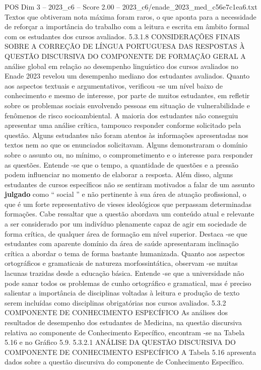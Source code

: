 \begin{textsample}{POS Dim 3 – 2023\_c6 – Score 2.00 – 2023\_c6/enade\_2023\_med\_c56e7c1ea6.txt}
Textos que obtiveram nota máxima foram raros, o que aponta para a necessidade de reforçar a importância do trabalho com a leitura e escrita em âmbito formal com os estudantes dos cursos avaliados. 5.3.1.8 CONSIDERAÇÕES FINAIS SOBRE A CORREÇÃO DE LÍNGUA PORTUGUESA DAS RESPOSTAS À QUESTÃO DISCURSIVA DO COMPONENTE DE FORMAÇÃO GERAL A análise global em relação ao desempenho linguístico dos cursos avaliados no Enade 2023 revelou um desempenho mediano dos estudantes avaliados.
Quanto aos aspectos textuais e argumentativos, verificou -se um nível baixo de conhecimento e mesmo de interesse, por parte de muitos estudantes, em refletir sobre os problemas sociais envolvendo pessoas em situação de vulnerabilidade e fenômenos de risco socioambiental.
A maioria dos estudantes não conseguiu apresentar uma análise crítica, tampouco responder conforme solicitado pela questão.
Alguns estudantes não foram atentos às informações apresentadas nos textos nem ao que os enunciados solicitavam.
Alguns demonstraram o domínio sobre o assunto ou, no mínimo, o comprometimento e o interesse para responder as questões.
Entende -se que o tempo, a quantidade de questões e a pressão podem influenciar no momento de elaborar a resposta.
Além disso, alguns estudantes de cursos específicos não se sentiram motivados a falar de um assunto \textbf{julgado} como “ social ” e não pertinente à sua área de atuação profissional, o que é um forte representativo de vieses ideológicos que perpassam determinadas formações.
Cabe ressaltar que a questão abordava um conteúdo atual e relevante a ser considerado por um indivíduo plenamente capaz de agir em sociedade de forma crítica, de qualquer área de formação em nível superior.
Destaca -se que estudantes com aparente domínio da área de saúde apresentaram inclinação crítica a abordar o tema de forma bastante humanizada.
Quanto aos aspectos ortográficos e gramaticais de natureza morfossintática, observam -se muitas lacunas trazidas desde a educação básica.
Entende -se que a universidade não pode sanar todos os problemas de cunho ortográfico e gramatical, mas é preciso salientar a importância de disciplinas voltadas à leitura e produção de texto serem incluídas como disciplinas obrigatórias nos cursos avaliados. 5.3.2 COMPONENTE DE CONHECIMENTO ESPECÍFICO As análises dos resultados de desempenho dos estudantes de Medicina, na questão discursiva relativa ao componente de Conhecimento Específico, encontram -se na Tabela 5.16 e no Gráfico 5.9. 5.3.2.1 ANÁLISE DA QUESTÃO DISCURSIVA DO COMPONENTE DE CONHECIMENTO ESPECÍFICO A Tabela 5.16 apresenta dados sobre a questão discursiva do componente de Conhecimento Específico.

\end{textsample}
